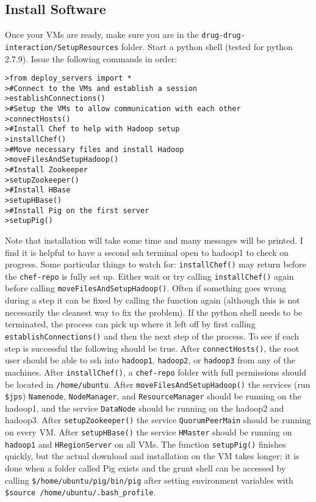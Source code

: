 \documentclass[letterpaper]{article}
\begin{document}
\subsection{Install Software}

Once your VMs are ready, make sure you are in the \lstinline|drug-drug-interaction/SetupResources| folder. Start a python shell (tested for python 2.7.9). Issue the following commands in order:
\begin{lstlisting}
>from deploy_servers import *
>#Connect to the VMs and establish a session
>establishConnections()
>#Setup the VMs to allow communication with each other
>connectHosts()
>#Install Chef to help with Hadoop setup
>installChef()
>#Move necessary files and install Hadoop
>moveFilesAndSetupHadoop()
>#Install Zookeeper
>setupZookeeper()
>#Install HBase
>setupHBase()
>#Install Pig on the first server
>setupPig()
\end{lstlisting}

Note that installation will take some time and many messages will be printed. I find it is helpful to have a second ssh terminal open to hadoop1 to check on progress. Some particular things to watch for: \lstinline|installChef()| may return before the \lstinline|chef-repo| is fully set up. Either wait or try calling \lstinline|installChef()| again before calling \lstinline|moveFilesAndSetupHadoop()|. Often if something goes wrong during a step it can be fixed by calling the function again (although this is not necessarily the cleanest way to fix the problem). If the python shell needs to be terminated, the process can pick up where it left off by first calling \lstinline|establishConnections()| and then the next step of the process. To see if each step is successful the following should be true. After \lstinline|connectHosts()|, the root user should be able to ssh into \lstinline|hadoop1|, \lstinline|hadoop2|, or \lstinline|hadoop3| from any of the machines. After \lstinline|installChef()|, a \lstinline|chef-repo| folder with full permissions should be located in \lstinline|/home/ubuntu|. After \lstinline|moveFilesAndSetupHadoop()| the services (run \lstinline|$jps|) \lstinline|Namenode|, \lstinline|NodeManager|, and \lstinline|ResourceManager| should be running on the hadoop1, and the service \lstinline|DataNode| should be running on the hadoop2 and hadoop3. After \lstinline|setupZookeeper()| the service \lstinline|QuorumPeerMain| should be running on every VM. After \lstinline|setupHBase()| the service \lstinline|HMaster| should be running on \lstinline|hadoop1| and \lstinline|HRegionServer| on all VMs. The function \lstinline|setupPig()| finishes quickly, but the actual download and installation on the VM takes longer; it is done when a folder called Pig exists and the grunt shell can be accessed by calling \lstinline|$/home/ubuntu/pig/bin/pig| after setting environment variables with \lstinline|$source /home/ubuntu/.bash_profile|.
\end{document}
